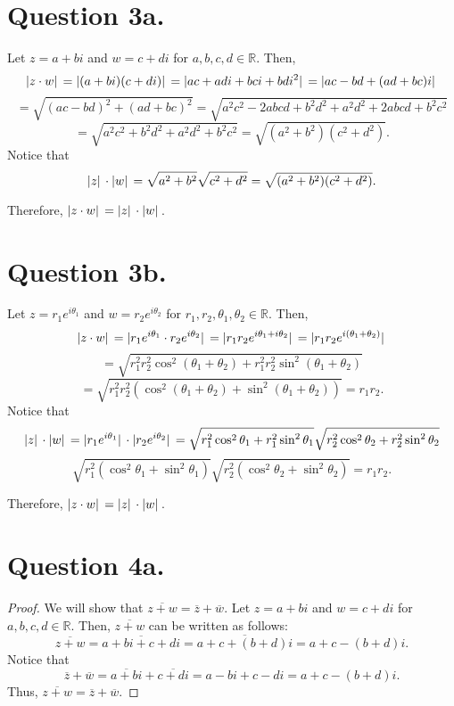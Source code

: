 \documentclass{article}
\begin{document}
\section*{Question 3a.}

\noindent Let $ z = a + bi $ and $ w = c + di $ for $ a, b, c, d \in \mathbb{R} $. Then,
\[
    \abs*{z \cdot w} = \abs*{(a + bi)(c + di)} = \abs*{ac + adi + bci + bdi^2} = \abs*{ac - bd + (ad + bc)i}
\]
\[
    = \sqrt{(ac - bd)^2 + (ad + bc)^2} = \sqrt{a^2c^2 - 2abcd + b^2d^2 + a^2d^2 + 2abcd + b^2c^2}
\]
\[
    = \sqrt{a^2c^2 + b^2d^2 + a^2d^2 + b^2c^2} = \sqrt{(a^2 + b^2)(c^2 + d^2)}.
\]
Notice that
\[
    \abs*{z} \cdot \abs*{w} = \sqrt{a^2 + b^2} \sqrt{c^2 + d^2} = \sqrt{(a^2 + b^2)(c^2 + d^2)}.
\]

\noindent Therefore, $ \abs*{z \cdot w} = \abs*{z} \cdot \abs*{w} $.

\section*{Question 3b.}

\noindent Let $ z = r_1e^{i\theta_1} $ and $ w = r_2e^{i\theta_2} $ for $ r_1, r_2, \theta_1, \theta_2 \in \mathbb{R} $. Then,
\[
    \abs*{z \cdot w} = \abs*{r_1e^{i\theta_1} \cdot r_2e^{i\theta_2}} = \abs*{r_1r_2e^{i\theta_1 + i\theta_2}} = \abs*{r_1r_2e^{i(\theta_1 + \theta_2)}}
\]
\[
    = \sqrt{r_1^2r_2^2\cos^2(\theta_1 + \theta_2) + r_1^2r_2^2\sin^2(\theta_1 + \theta_2)}
\]
\[
    = \sqrt{r_1^2r_2^2(\cos^2(\theta_1 + \theta_2) + \sin^2(\theta_1 + \theta_2))} = r_1r_2.
\]
Notice that
\[
    \abs*{z} \cdot \abs*{w} = \abs*{r_1e^{i\theta_1}} \cdot \abs*{r_2e^{i\theta_2}} = \sqrt{r_1^2\cos^2\theta_1 + r_1^2\sin^2\theta_1} \sqrt{r_2^2\cos^2\theta_2 + r_2^2\sin^2\theta_2}
\]
\[
    \sqrt{r_1^2(\cos^2\theta_1 + \sin^2\theta_1)} \sqrt{r_2^2(\cos^2\theta_2 + \sin^2\theta_2)} = r_1r_2.
\]

\noindent Therefore, $ \abs*{z \cdot w} = \abs*{z} \cdot \abs*{w} $.

\section*{Question 4a.}
\begin{proof}
    We will show that $ \overline{z + w} = \overline{z} + \overline{w} $. Let $ z = a + bi $ and $ w = c + di $ for $ a, b, c, d \in \mathbb{R} $. Then, $ \overline{z + w} $ can be written as follows:
    \[
        \overline{z + w} = \overline{a + bi + c + di}  = \overline{a + c + (b + d)i} = a + c - (b + d)i.
    \]
    Notice that
    \[
        \overline{z} + \overline{w} = \overline{a + bi} + \overline{c + di} = a - bi + c - di = a + c - (b + d)i.
    \]
    Thus, $ \overline{z + w} = \overline{z} + \overline{w} $.
\end{proof}
\end{document}
